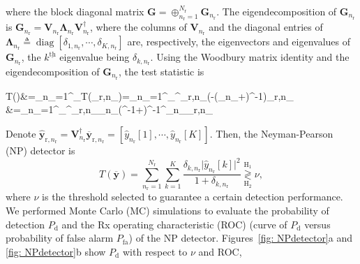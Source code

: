\documentclass[10pt,journal]{IEEEtran}
\DeclareMathOperator{\diag}{\mathrm{diag}}
\newcommand{\paren}[1]{\left({#1}\right)}
\newcommand{\bracket}[1]{{\left [{#1}\right ]}}
\newcommand{\ith}[1]    {{#1}^{\underline{\text{th}}}}
\newcommand{\rr}{_\mathrm{r}}
\theoremstyle{definition}
\begin{document}
		where the block diagonal matrix $\mathbf{G}=\oplus_{n\rr=1}^{\mathit{N}\rr}\mathbf{G}_{n\rr}$. The eigendecomposition of $\mathbf{G}_{n\rr}$ is $\mathbf{G}_{n\rr}=\mathbf{V}_{n\rr}\mathbf{\Lambda}_{n\rr}\mathbf{V}^\dagger_{n\rr}$, where the columns of $\mathbf{V}_{n\rr}$ and the diagonal entries of $\mathbf{\Lambda}_{n\rr}\triangleq\diag\bracket{\delta_{1,n\rr},\cdots,\delta_{\mathit{K},n\rr}}$ are, respectively, the eigenvectors and eigenvalues of $\mathbf{G}_{n\rr}$, the $\ith{k}$ eigenvalue being $\delta_{k,n\rr}$. Using the Woodbury matrix identity and the eigendecomposition of $\mathbf{G}_{n\rr}$, the test statistic is\par\noindent\small
		\begin{flalign}
			T\paren{}&=\sum_{n\rr=1}^{\rr}T\paren{_{\textrm{r},n\rr}}=\sum_{n\rr=1}^{\rr}^\dagger_{\textrm{r},n\rr}\paren{-\paren{_{n\rr}+\mathbf{I}}^{-1}}_{\textrm{r},n\rr}\nonumber\\
			&=\sum_{n\rr=1}^{\rr}^\dagger_{\textrm{r},n\rr}_{n\rr}\paren{\mathbf{\Lambda}^{-1}+}^{-1}^\dagger_{n\rr}_{\textrm{r},n\rr}
		\end{flalign}\normalsize
		Denote $\widehat{\mathbf{y}}_{\textrm{r},n\rr}=\mathbf{V}^\dagger_{n\rr}\overline{\mathbf{y}}_{\textrm{r},n\rr}=\bracket{\widehat{y}_{n\rr}\bracket{1},\cdots,\widehat{y}_{n\rr}\bracket{\mathit{K}}}$. Then, the Neyman-Pearson (NP) detector is\cite{Kay1993detection}
		\begin{equation}
			\label{eq: NPdetector}
			T\paren{\overline{\mathbf{y}}}=\sum_{n\rr=1}^{\mathit{N}\rr}\sum_{k=1}^{\mathit{K}}\frac{\delta_{k,n\rr}\lvert\widehat{y}_{n\rr}\bracket{k}\rvert^2}{1+\delta_{k,n\rr}}\underset{\mathrm{H}_2}{\overset{\mathrm{H}_1}{\gtrless}}\nu,
		\end{equation}
		where $\nu$ is the threshold selected to guarantee a certain detection performance. We performed Monte Carlo (MC) simulations to evaluate the probability of detection $\mathit{P}_{\textrm{d}}$ and the Rx operating characteristic (ROC) (curve of $\mathit{P}_{\textrm{d}}$ versus probability of false alarm $\mathit{P}_{\textrm{fa}}$) of the NP detector. Figures~\ref{fig: NPdetector}a and \ref{fig: NPdetector}b show $\mathit{P}_{\textrm{d}}$ with respect to $\nu$ and ROC, %
\end{document}
